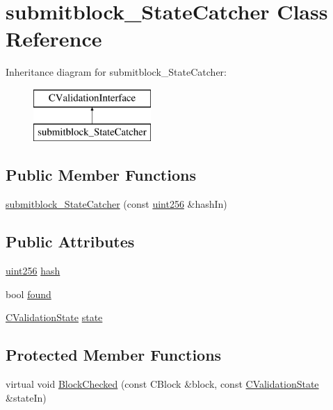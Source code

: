 \hypertarget{classsubmitblock___state_catcher}{}\section{submitblock\+\_\+\+State\+Catcher Class Reference}
\label{classsubmitblock___state_catcher}
Inheritance diagram for submitblock\+\_\+\+State\+Catcher\+:\begin{figure}[H]
\begin{center}
\leavevmode
\includegraphics[height=2.000000cm]{classsubmitblock___state_catcher}
\end{center}
\end{figure}
\subsection*{Public Member Functions}
\begin{DoxyCompactItemize}
\item 
\hyperlink{classsubmitblock___state_catcher_a4751e652aed4193935ed00e95cfca548}{submitblock\+\_\+\+State\+Catcher} (const \hyperlink{classuint256}{uint256} \&hash\+In)
\end{DoxyCompactItemize}
\subsection*{Public Attributes}
\begin{DoxyCompactItemize}
\item 
\hyperlink{classuint256}{uint256} \hyperlink{classsubmitblock___state_catcher_adcc822af0b1305bcda71f8e9656c4239}{hash}
\item 
bool \hyperlink{classsubmitblock___state_catcher_a61c0d03544cd4495534bdb0b52f36886}{found}
\item 
\hyperlink{class_c_validation_state}{C\+Validation\+State} \hyperlink{classsubmitblock___state_catcher_a78357802ab8d143f6f21929e0aa2d727}{state}
\end{DoxyCompactItemize}
\subsection*{Protected Member Functions}
\begin{DoxyCompactItemize}
\item 
virtual void \hyperlink{classsubmitblock___state_catcher_a7c7174ac1a54c80c572b115114aa2ee6}{Block\+Checked} (const C\+Block \&block, const \hyperlink{class_c_validation_state}{C\+Validation\+State} \&state\+In)
\end{DoxyCompactItemize}


